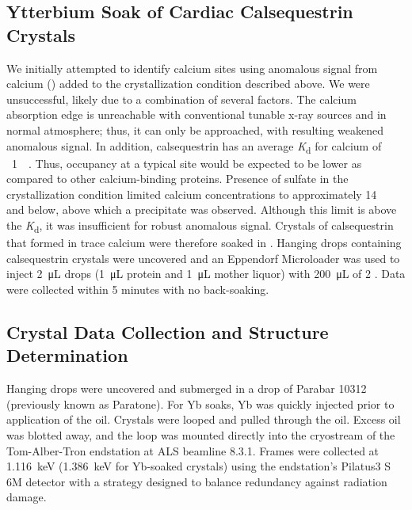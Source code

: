 \subsection*{Ytterbium Soak of Cardiac Calsequestrin Crystals}
We initially attempted to identify calcium sites using anomalous signal from calcium () added to the crystallization condition described above. We were unsuccessful, likely due to a combination of several factors. The calcium absorption edge is unreachable with conventional tunable x-ray sources and in normal atmosphere; thus, it can only be approached, with resulting weakened anomalous signal. In addition, calsequestrin has an average \textit{K}\textsubscript{d} for calcium of ~\SI{1}{\milli\Molar}. Thus, occupancy at a typical site would be expected to be lower as compared to other calcium-binding proteins. Presence of sulfate in the crystallization condition limited calcium concentrations to approximately \SI{14}{\milli\Molar} and below, above which a precipitate was observed. Although this limit is above the \textit{K}\textsubscript{d}, it was insufficient for robust anomalous signal. Crystals of calsequestrin that formed in trace calcium were therefore soaked in . Hanging drops containing calsequestrin crystals were uncovered and an Eppendorf Microloader was used to inject \SI{2}{\micro\liter} drops (\SI{1}{\micro\liter} protein and \SI{1}{\micro\liter} mother liquor) with \SI{200}{\micro\liter} of \SI{2}{\Molar} . Data were collected within 5 minutes with no back-soaking.

\subsection*{Crystal Data Collection and Structure Determination}
Hanging drops were uncovered and submerged in a drop of Parabar 10312 (previously known as Paratone). For Yb soaks, Yb was quickly injected prior to application of the oil. Crystals were looped and pulled through the oil. Excess oil was blotted away, and the loop was mounted directly into the cryostream of the Tom-Alber-Tron endstation at ALS beamline 8.3.1. Frames were collected at \SI{1.116}{\keV} (\SI{1.386}{\keV} for Yb-soaked crystals) using the endstation's Pilatus3 S 6M detector with a strategy designed to balance redundancy against radiation damage. 


